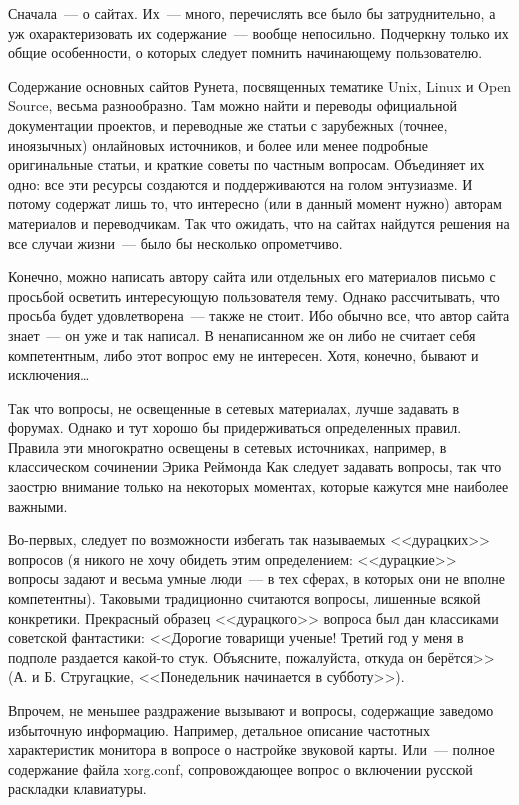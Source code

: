 Сначала~--- о сайтах. Их~--- много, перечислять все было бы затруднительно, а уж охарактеризовать их содержание~--- вообще непосильно. Подчеркну только их общие особенности, о которых следует помнить начинающему пользователю.

Содержание основных сайтов Рунета, посвященных тематике Unix, Linux и Open Source, весьма разнообразно. Там можно найти и переводы официальной документации проектов, и переводные же статьи с зарубежных (точнее, иноязычных) онлайновых источников, и более или менее подробные оригинальные статьи, и краткие советы по частным вопросам. Объединяет их одно: все эти ресурсы создаются и поддерживаются на голом энтузиазме. И потому содержат лишь то, что интересно (или в данный момент нужно) авторам материалов и переводчикам. Так что ожидать, что на сайтах найдутся решения на все случаи жизни~--- было бы несколько опрометчиво.

Конечно, можно написать автору сайта или отдельных его материалов письмо с просьбой осветить интересующую пользователя тему. Однако рассчитывать, что просьба будет удовлетворена~--- также не стоит. Ибо обычно все, что автор сайта знает~--- он уже и так написал. В ненаписанном же он либо не считает себя компетентным, либо этот вопрос ему не интересен. Хотя, конечно, бывают и исключения\dots

Так что вопросы, не освещенные в сетевых материалах, лучше задавать в форумах. Однако и тут хорошо бы придерживаться определенных правил. Правила эти многократно освещены в сетевых источниках, например, в классическом сочинении Эрика Реймонда Как следует задавать вопросы, так что заострю внимание только на некоторых моментах, которые кажутся мне наиболее важными.

Во-первых, следует по возможности избегать так называемых <<дурацких>> вопросов (я никого не хочу обидеть этим определением: <<дурацкие>> вопросы задают и весьма умные люди~--- в тех сферах, в которых они не вполне компетентны). Таковыми традиционно считаются вопросы, лишенные всякой конкретики. Прекрасный образец <<дурацкого>> вопроса был дан классиками советской фантастики: <<Дорогие товарищи ученые! Третий год у меня в подполе раздается какой-то стук. Объясните, пожалуйста, откуда он берётся>> (А. и Б. Стругацкие, <<Понедельник начинается в субботу>>).

Впрочем, не меньшее раздражение вызывают и вопросы, содержащие заведомо избыточную информацию. Например, детальное описание частотных характеристик монитора в вопросе о настройке звуковой карты. Или~--- полное содержание файла xorg.conf, сопровождающее вопрос о включении русской раскладки клавиатуры.

